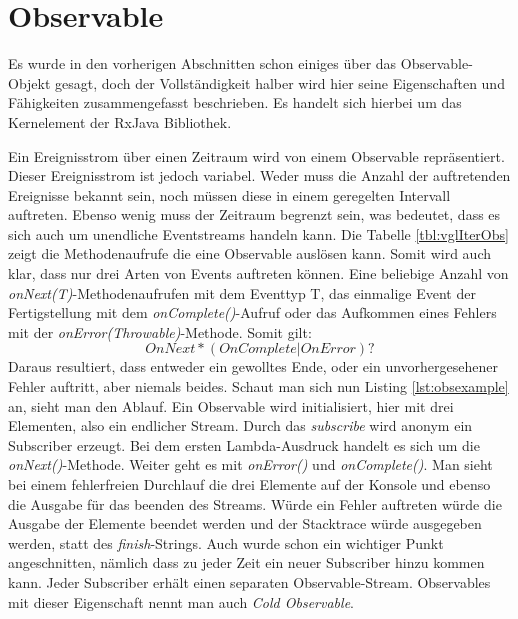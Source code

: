 \section{Observable}
Es wurde in den vorherigen Abschnitten schon einiges über das Observable-Objekt gesagt, doch der Vollständigkeit halber wird hier seine Eigenschaften und Fähigkeiten zusammengefasst beschrieben. Es handelt sich hierbei um das Kernelement der RxJava Bibliothek.

Ein Ereignisstrom über einen Zeitraum wird von einem Observable repräsentiert. Dieser Ereignisstrom ist jedoch variabel. Weder muss die Anzahl der auftretenden Ereignisse bekannt sein, noch müssen diese in einem geregelten Intervall auftreten. Ebenso wenig muss der Zeitraum begrenzt sein, was bedeutet, dass es sich auch um unendliche Eventstreams handeln kann. Die Tabelle \ref{tbl:vglIterObs} zeigt die Methodenaufrufe die eine Observable auslösen kann. Somit wird auch klar, dass nur drei Arten von Events auftreten können. Eine beliebige Anzahl von \textit{onNext(T)}-Methodenaufrufen mit dem Eventtyp T, das einmalige Event der Fertigstellung mit dem \textit{onComplete()}-Aufruf oder das Aufkommen eines Fehlers mit der \textit{onError(Throwable)}-Methode. Somit gilt: 
\begin{displaymath}
	OnNext*(OnComplete | OnError)?
\end{displaymath}
Daraus resultiert, dass entweder ein gewolltes Ende, oder ein unvorhergesehener Fehler auftritt, aber niemals beides. Schaut man sich nun Listing \ref{lst:obsexample} an, sieht man den Ablauf. Ein Observable wird initialisiert, hier mit drei Elementen, also ein endlicher Stream. Durch das \textit{subscribe} wird anonym ein Subscriber erzeugt. Bei dem ersten Lambda-Ausdruck handelt es sich um die \textit{onNext()}-Methode. Weiter geht es mit \textit{onError()} und \textit{onComplete()}. Man sieht bei einem fehlerfreien Durchlauf die drei Elemente auf der Konsole und ebenso die Ausgabe für das beenden des Streams. Würde ein Fehler auftreten würde die Ausgabe der Elemente beendet werden und der Stacktrace würde ausgegeben werden, statt des \textit{finish}-Strings. Auch wurde schon ein wichtiger Punkt angeschnitten, nämlich dass zu jeder Zeit ein neuer Subscriber hinzu kommen kann. Jeder Subscriber erhält einen separaten Observable-Stream. Observables mit dieser Eigenschaft nennt man auch \textit{Cold Observable}.

